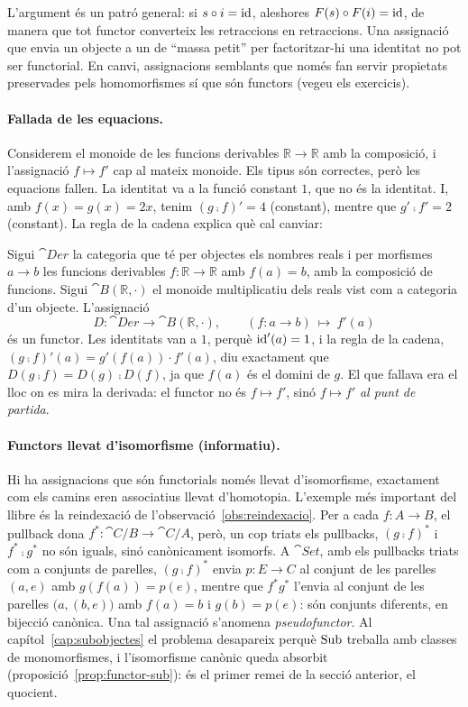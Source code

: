L'argument és un patró general: si $s\circ i=\operatorname{id}$, aleshores $F(s)\circ F(i)=\operatorname{id}$, de manera que tot functor converteix les retraccions en retraccions. Una assignació que envia un objecte a un de \enquote{massa petit} per factoritzar-hi una identitat no pot ser functorial. En canvi, assignacions semblants que només fan servir propietats preservades pels homomorfismes sí que són functors (vegeu els exercicis).

\paragraph{Fallada de les equacions.} Considerem el monoide de les funcions derivables $\mathbb R\to\mathbb R$ amb la composició, i l'assignació $f\mapsto f'$ cap al mateix monoide. Els tipus són correctes, però les equacions fallen. La identitat va a la funció constant $1$, que no és la identitat. I, amb $f(x)=g(x)=2x$, tenim $(g\comp f)'=4$ (constant), mentre que $g'\comp f'=2$ (constant). La regla de la cadena explica què cal canviar:

\begin{exemple}\label{ex:regla-cadena}
Sigui $\cat{Der}$ la categoria que té per objectes els nombres reals i per morfismes $a\to b$ les funcions derivables $f\colon\mathbb R\to\mathbb R$ amb $f(a)=b$, amb la composició de funcions. Sigui $\cat{B}(\mathbb R,\cdot)$ el monoide multiplicatiu dels reals vist com a categoria d'un objecte. L'assignació
\[
D\colon\cat{Der}\to\cat{B}(\mathbb R,\cdot),\qquad (f\colon a\to b)\ \longmapsto\ f'(a)
\]
és un functor. Les identitats van a $1$, perquè $\operatorname{id}'(a)=1$, i la regla de la cadena, $(g\comp f)'(a)=g'(f(a))\cdot f'(a)$, diu exactament que $D(g\comp f)=D(g)\comp D(f)$, ja que $f(a)$ és el domini de $g$. El que fallava era el lloc on es mira la derivada: el functor no és $f\mapsto f'$, sinó $f\mapsto f'$ \emph{al punt de partida}.
\end{exemple}

\paragraph{Functors llevat d'isomorfisme (informatiu).} Hi ha assignacions que són functorials només llevat d'isomorfisme, exactament com els camins eren associatius llevat d'homotopia. L'exemple més important del llibre és la reindexació de l'observació~\ref{obs:reindexacio}. Per a cada $f\colon A\to B$, el pullback dona $f^{*}\colon\cat{C}/B\to\cat{C}/A$, però, un cop triats els pullbacks, $(g\comp f)^{*}$ i $f^{*}\comp g^{*}$ no són iguals, sinó canònicament isomorfs. A $\cat{Set}$, amb els pullbacks triats com a conjunts de parelles, $(g\comp f)^{*}$ envia $p\colon E\to C$ al conjunt de les parelles $(a,e)$ amb $g(f(a))=p(e)$, mentre que $f^{*}g^{*}$ l'envia al conjunt de les parelles $\bigl(a,(b,e)\bigr)$ amb $f(a)=b$ i $g(b)=p(e)$: són conjunts diferents, en bijecció canònica. Una tal assignació s'anomena \emph{pseudofunctor}. Al capítol~\ref{cap:subobjectes} el problema desapareix perquè $\operatorname{Sub}$ treballa amb classes de monomorfismes, i l'isomorfisme canònic queda absorbit (proposició~\ref{prop:functor-sub}): és el primer remei de la secció anterior, el quocient.

